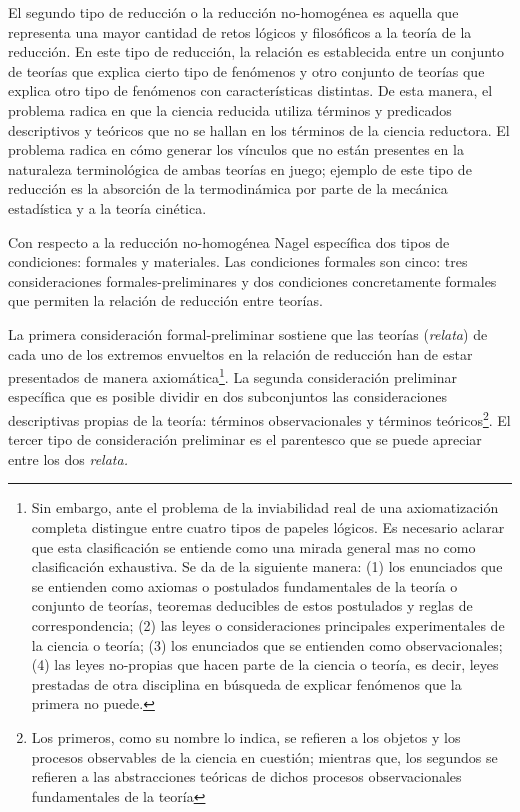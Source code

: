 \documentclass[]{book}
\begin{document}
\begin{refsection}
El segundo tipo de reducción o la reducción no-homogénea es aquella que
representa una mayor cantidad de retos lógicos y filosóficos a la teoría
de la reducción. En este tipo de reducción, la relación es establecida
entre un conjunto de teorías que explica cierto tipo de fenómenos y otro
conjunto de teorías que explica otro tipo de fenómenos con
características distintas. De esta manera, el problema radica en que la
ciencia reducida utiliza términos y predicados descriptivos y teóricos
que no se hallan en los términos de la ciencia reductora. El problema
radica en cómo generar los vínculos que no están presentes en la
naturaleza terminológica de ambas teorías en juego; ejemplo de este tipo
de reducción es la absorción de la termodinámica por parte de la
mecánica estadística y a la teoría cinética.

Con respecto a la reducción no-homogénea Nagel específica dos tipos de
condiciones: formales y materiales. Las condiciones formales son cinco:
tres consideraciones formales-preliminares y dos condiciones
concretamente formales que permiten la relación de reducción entre
teorías.

La primera consideración formal-preliminar sostiene que las teorías
(\emph{relata}) de cada uno de los extremos envueltos en la relación de
reducción han de estar presentados de manera axiomática\footnote{Sin
  embargo, ante el problema de la inviabilidad real de una
  axiomatización completa distingue entre cuatro tipos de papeles
  lógicos. Es necesario aclarar que esta clasificación se entiende como
  una mirada general mas no como clasificación exhaustiva. Se da de la
  siguiente manera: (1) los enunciados que se entienden como axiomas o
  postulados fundamentales de la teoría o conjunto de teorías, teoremas
  deducibles de estos postulados y reglas de correspondencia; (2) las
  leyes o consideraciones principales experimentales de la ciencia o
  teoría; (3) los enunciados que se entienden como observacionales; (4)
  las leyes no-propias que hacen parte de la ciencia o teoría, es decir,
  leyes prestadas de otra disciplina en búsqueda de explicar fenómenos
  que la primera no puede.}. La segunda consideración preliminar
específica que es posible dividir en dos subconjuntos las
consideraciones descriptivas propias de la teoría: términos
observacionales y términos teóricos\footnote{Los primeros, como su
  nombre lo indica, se refieren a los objetos y los procesos observables
  de la ciencia en cuestión; mientras que, los segundos se refieren a
  las abstracciones teóricas de dichos procesos observacionales
  fundamentales de la teoría}. El tercer tipo de consideración
preliminar es el parentesco que se puede apreciar entre los dos
\emph{relata.}


\end{refsection}
\end{document}
